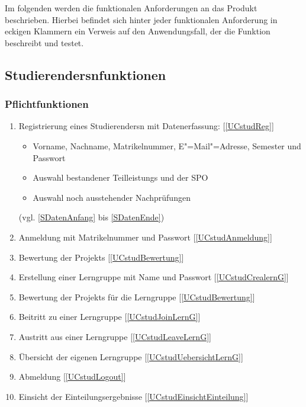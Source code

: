 \documentclass[parskip=full]{scrartcl}
\newcommand{\swtLabel}[1]{\textbf{/#1\arabic*0/}}
\newcommand{\testRef}[1]{[\ref{#1}]}
\begin{document}
Im folgenden werden die funktionalen Anforderungen an das Produkt beschrieben.
Hierbei befindet sich hinter jeder funktionalen Anforderung in eckigen Klammern
ein Verweis auf den Anwendungsfall, der die Funktion beschreibt und testet.

\subsection{\glspl{Studierender}nfunktionen}

\subsubsection{Pflichtfunktionen}

\begin{enumerate}[label=\swtLabel{FA}]
  \item Registrierung eines \glspl{Studierender}n mit Datenerfassung: \testRef{UCstudReg}
  \label{FAregistrierung}
  \begin{itemize}
    \item Vorname, Nachname, \gls{Matrikelnummer}, E"=Mail"=Adresse, Semester und
    Passwort
    \item Auswahl bestandener \glspl{Teilleistung} und der \gls{SPO}
    \item Auswahl noch ausstehender Nachprüfungen 
  \end{itemize}
  (vgl.  \ref{SDatenAnfang} bis \ref{SDatenEnde})
  \item Anmeldung mit \gls{Matrikelnummer} und Passwort\label{FAStudanmeldung}
  \testRef{UCstudAnmeldung}
  \item \gls{Bewertung} der \glspl{Projekt} \label{FAbewertung} \testRef{UCstudBewertung}
  \item Erstellung einer \gls{Lerngruppe} mit Name und Passwort
  \label{FAcreatelerng} \testRef{UCstudCrealernG}
  \item \gls{Bewertung} der \glspl{Projekt} für die \gls{Lerngruppe} 
  \label{FAbewertung2} \testRef{UCstudBewertung}
  \item Beitritt zu einer \gls{Lerngruppe} \label{FAjoinLerng}
  \testRef{UCstudJoinLernG}
  \item Austritt aus einer \gls{Lerngruppe} \label{FAlergAustritt}
  \testRef{UCstudLeaveLernG}
  \item Übersicht der eigenen \gls{Lerngruppe} 
  \label{FAcheckLerng} \testRef{UCstudUebersichtLernG}
  \item Abmeldung \label{FAStudabmeldung} \testRef{UCstudLogout}
  \item Einsicht der \gls{Einteilung}sergebnisse \label{FAStudeinsicht} \testRef{UCstudEinsichtEinteilung}
\end{enumerate}
\end{document}

